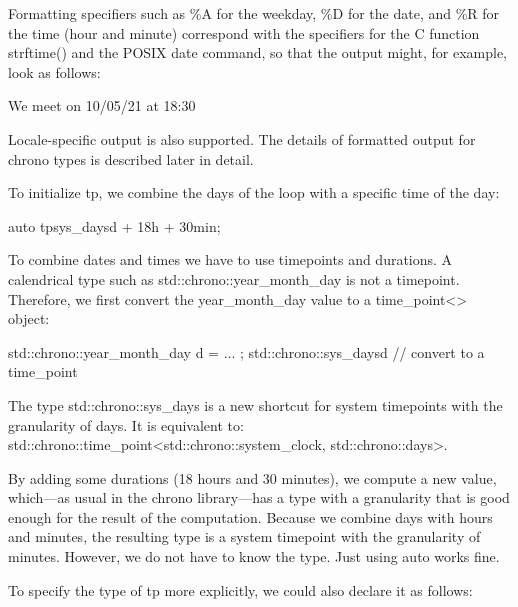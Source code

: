 
Formatting specifiers such as \%A for the weekday, \%D for the date, and \%R for the time (hour and minute) correspond with the specifiers for the C function strftime() and the POSIX date command, so that the output might, for example, look as follows:

\begin{shell}
We meet on 10/05/21 at 18:30
\end{shell}

Locale-specific output is also supported. The details of formatted output for chrono types is described later in detail.


To initialize tp, we combine the days of the loop with a specific time of the day:

\begin{cpp}
auto tp{sys_days{d} + 18h + 30min};
\end{cpp}

To combine dates and times we have to use timepoints and durations. A calendrical type such as std::chrono::year\_month\_day is not a timepoint. Therefore, we first convert the year\_month\_day value to a time\_point<> object:

\begin{cpp}
std::chrono::year_month_day d = ... ;
std::chrono::sys_days{d} // convert to a time_point
\end{cpp}

The type std::chrono::sys\_days is a new shortcut for system timepoints with the granularity of days. It is equivalent to: std::chrono::time\_point<std::chrono::system\_clock, std::chrono::days>.

By adding some durations (18 hours and 30 minutes), we compute a new value, which—as usual in the chrono library—has a type with a granularity that is good enough for the result of the computation. Because we combine days with hours and minutes, the resulting type is a system timepoint with the granularity of minutes. However, we do not have to know the type. Just using auto works fine.

To specify the type of tp more explicitly, we could also declare it as follows:

